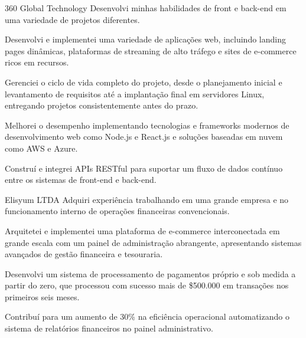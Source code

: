 \begin{experience}{360 Global Technology}{
}
Desenvolvi minhas habilidades de front e back-end em uma variedade de projetos diferentes.\\
\begin{contribs}
	\item{Desenvolvi e implementei uma variedade de aplicações web, incluindo landing pages dinâmicas, plataformas de streaming de alto tráfego e sites de e-commerce ricos em recursos.}
	\item{Gerenciei o ciclo de vida completo do projeto, desde o planejamento inicial e levantamento de requisitos até a implantação final em servidores Linux, entregando projetos consistentemente antes do prazo.}
	\item{Melhorei o desempenho implementando tecnologias e frameworks modernos de desenvolvimento web como Node.js e React.js e soluções baseadas em nuvem como AWS e Azure.}
	\item{Construí e integrei APIs RESTful para suportar um fluxo de dados contínuo entre os sistemas de front-end e back-end.}
\end{contribs}

\end{experience}

\begin{experience}[last]{Elisyum LTDA}{
}
Adquiri experiência trabalhando em uma grande empresa e no funcionamento interno de operações financeiras convencionais.\\
\begin{contribs}
	\item{Arquitetei e implementei uma plataforma de e-commerce interconectada em grande escala com um painel de administração abrangente, apresentando sistemas avançados de gestão financeira e tesouraria.}
	\item{Desenvolvi um sistema de processamento de pagamentos próprio e sob medida a partir do zero, que processou com sucesso mais de \$500.000 em transações nos primeiros seis meses.}
	\item{Contribuí para um aumento de 30\% na eficiência operacional automatizando o sistema de relatórios financeiros no painel administrativo.}
\end{contribs}

\end{experience}
